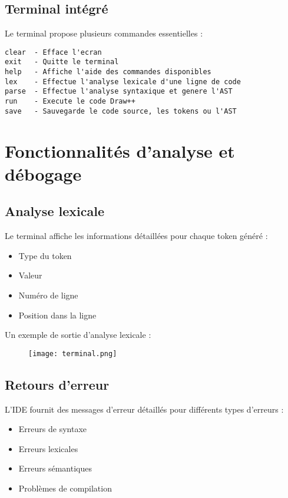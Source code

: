 \documentclass[12pt,a4paper]{report}
\begin{document}
\subsection{Terminal intégré}
Le terminal propose plusieurs commandes essentielles :
\begin{lstlisting}[style=customStyle]
clear  - Efface l'ecran
exit   - Quitte le terminal
help   - Affiche l'aide des commandes disponibles
lex    - Effectue l'analyse lexicale d'une ligne de code
parse  - Effectue l'analyse syntaxique et genere l'AST
run    - Execute le code Draw++
save   - Sauvegarde le code source, les tokens ou l'AST
\end{lstlisting}


\section{Fonctionnalités d'analyse et débogage}

\subsection{Analyse lexicale}
Le terminal affiche les informations détaillées pour chaque token généré :
\begin{itemize}
    \item Type du token
    \item Valeur
    \item Numéro de ligne
    \item Position dans la ligne
\end{itemize}

Un exemple de sortie d'analyse lexicale :
\begin{figure}[H]
    \centering
    \texttt{[image: terminal.png]}
    \label{fig:enter-label}
\end{figure}

\subsection{Retours d'erreur}
L'IDE fournit des messages d'erreur détaillés pour différents types d'erreurs :
\begin{itemize}
    \item Erreurs de syntaxe
    \item Erreurs lexicales
    \item Erreurs sémantiques
    \item Problèmes de compilation
\end{itemize}
\end{document}
